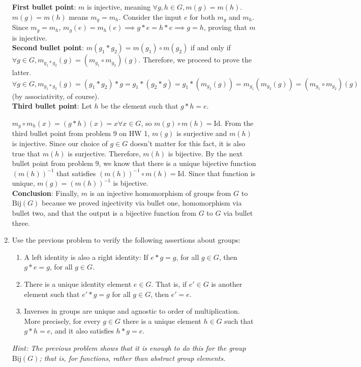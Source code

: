 \documentclass{amsart}
\begin{document}
\begin{enumerate}[itemsep=0.4in]
\textbf{First bullet point}: $m$ is injective, meaning $\forall g,h\in G,m(g)=m(h)$. $m(g)=m(h)$ means $m_g=m_h$. Consider the input $e$ for both $m_g$ and $m_h$. Since $m_g=m_h$, $m_g(e)=m_h(e)\implies g*e=h*e\implies g=h$, proving that $m$ is injective.\\

\textbf{Second bullet point}: $m(g_1*g_2)=m(g_1)\circ m(g_2)$ if and only if $\forall g\in G, m_{g_1*g_2}(g)=(m_{g_1}\circ m_{g_2})(g)$. Therefore, we proceed to prove the latter. $\forall g\in G, m_{g_1*g_2}(g)=(g_1*g_2)*g=g_1*(g_2*g)=g_1*(m_{g_2}(g))=m_{g_1}(m_{g_2}(g))=(m_{g_1}\circ m_{g_2})(g)$ (by associativity, of course).\\

\textbf{Third bullet point}: Let $h$ be the element such that $g*h=e$. 

$m_g\circ m_h(x)=(g*h)(x)=x\forall x\in G$, so $m(g)\circ m(h)=\mathrm{Id}$. From the third bullet point from problem 9 on HW 1, $m(g)$ is surjective and $m(h)$ is injective. Since our choice of $g\in G$ doesn't matter for this fact, it is also true that $m(h)$ is surjective. Therefore, $m(h)$ is bijective. By the next bullet point from problem 9, we know that there is a unique bijective function $(m(h))^{-1}$ that satisfies $(m(h))^{-1}\circ m(h)=\mathrm{Id}$. Since that function is unique, $m(g)=(m(h))^{-1}$ is bijective. \\

\textbf{Conclusion}: Finally, $m$ is an injective homomorphism of groups from $G$ to $\mathrm{Bij}(G)$ because we proved injectivity via bullet one, homomorphism via bullet two, and that the output is a bijective function from $G$ to $G$ via bullet three.


\item Use the previous problem to verify the following assertions about groups:
\begin{enumerate}
	\item A left identity is also a right identity: If $e*g = g$, for all $g\in G$, then $g*e = g$, for all $g\in G$.
	\item There is a unique identity element $e\in G$. That is, if $e'\in G$ is another element such that $e'*g = g$ for all $g\in G$, then $e' = e$.
	\item Inverses in groups are unique and agnostic to order of multiplication. More precisely, for every $g\in G$ there is a unique element $h\in G$ such that $g*h = e$, and it also satisfies $h*g = e$.
\end{enumerate}
 \emph{Hint: The previous problem shows that it is enough to do this for the group $\mathrm{Bij}(G)$; that is, for functions, rather than abstract group elements.}\\


\end{enumerate}
\end{document}
